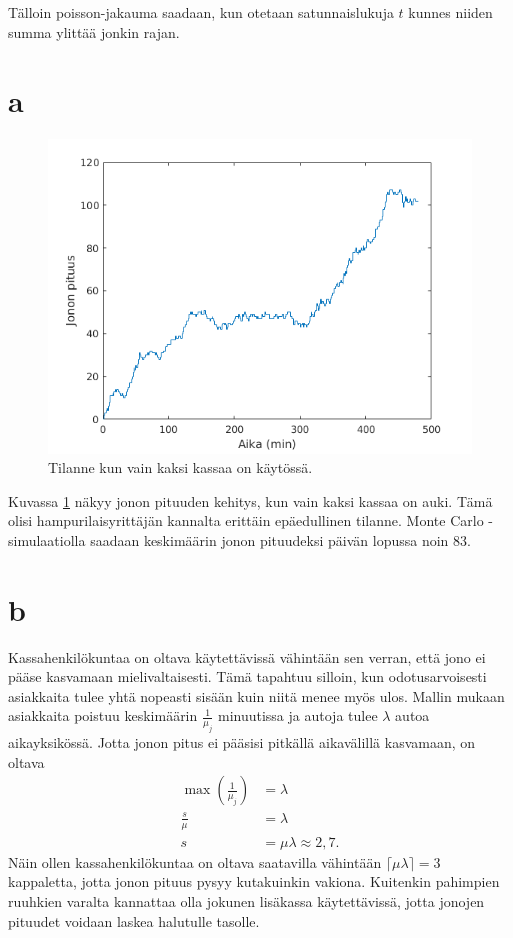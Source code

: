 \documentclass{article}     %
\begin{document}
Tälloin poisson-jakauma saadaan, kun otetaan satunnaislukuja $t$ kunnes niiden summa ylittää jonkin rajan.

\section*{a}

\begin{figure}
\centering
\includegraphics[width = \textwidth]{matlab/a.png}
\caption{Tilanne kun vain kaksi kassaa on käytössä.}
\label{fig:a}
\end{figure}

Kuvassa \ref{fig:a} näkyy jonon pituuden kehitys, kun vain kaksi kassaa on auki. Tämä olisi hampurilaisyrittäjän kannalta erittäin epäedullinen tilanne. Monte Carlo -simulaatiolla saadaan keskimäärin jonon pituudeksi päivän lopussa noin 83.

\section*{b}
Kassahenkilökuntaa on oltava käytettävissä vähintään sen verran, että jono ei pääse kasvamaan mielivaltaisesti. Tämä tapahtuu silloin, kun odotusarvoisesti asiakkaita tulee yhtä nopeasti sisään kuin niitä menee myös ulos. Mallin mukaan asiakkaita poistuu keskimäärin $\frac{1}{\mu_j}$ minuutissa ja autoja tulee $\lambda$ autoa aikayksikössä. Jotta jonon pitus ei pääsisi pitkällä aikavälillä kasvamaan, on oltava
\begin{align}
\max\left(\frac{1}{\mu_j}\right) &= \lambda \nonumber\\
\frac{s}{\mu} &= \lambda \nonumber\\
s &= \mu \lambda \approx 2,7.
\end{align}
Näin ollen kassahenkilökuntaa on oltava saatavilla vähintään $\lceil \mu \lambda \rceil = 3$ kappaletta, jotta jonon pituus pysyy kutakuinkin vakiona. Kuitenkin pahimpien ruuhkien varalta kannattaa olla jokunen lisäkassa käytettävissä, jotta jonojen pituudet voidaan laskea halutulle tasolle.
\end{document}
